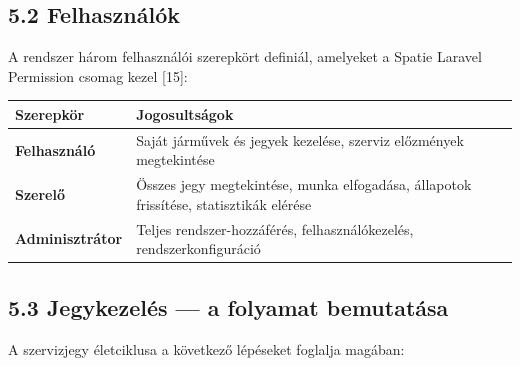 \subsection{5.2 Felhasználók}\label{felhasznuxe1luxf3k}

A rendszer három felhasználói szerepkört definiál, amelyeket a Spatie Laravel Permission csomag kezel {[}15{]}:

{\def\LTcaptype{} %
\begin{longtable}[]{@{}
  >{\raggedright\arraybackslash}p{}
  >{\raggedright\arraybackslash}p{}@{}}
\toprule\noalign{}
\begin{minipage}[b]{\linewidth}\raggedright
Szerepkör
\end{minipage} & \begin{minipage}[b]{\linewidth}\raggedright
Jogosultságok
\end{minipage} \\
\midrule\noalign{}
\endhead
\bottomrule\noalign{}
\endlastfoot
\textbf{Felhasználó} & Saját járművek és jegyek kezelése, szerviz előzmények megtekintése \\
\textbf{Szerelő} & Összes jegy megtekintése, munka elfogadása, állapotok frissítése, statisztikák elérése \\
\textbf{Adminisztrátor} & Teljes rendszer-hozzáférés, felhasználókezelés, rendszerkonfiguráció \\
\end{longtable}
}

\subsection{5.3 Jegykezelés --- a folyamat bemutatása}\label{jegykezeluxe9s-a-folyamat-bemutatuxe1sa}

A szervizjegy életciklusa a következő lépéseket foglalja magában:

